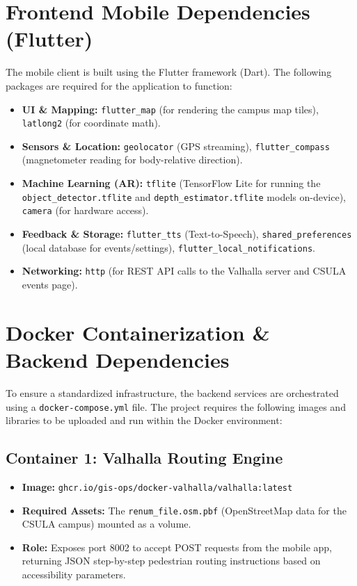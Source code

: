 \documentclass[12pt]{article}
\begin{document}
\section{Frontend Mobile Dependencies (Flutter)}
The mobile client is built using the Flutter framework (Dart). The following packages are required for the application to function:
\begin{itemize}[noitemsep]
    \item \textbf{UI \& Mapping:} \texttt{flutter\_map} (for rendering the campus map tiles), \texttt{latlong2} (for coordinate math).
    \item \textbf{Sensors \& Location:} \texttt{geolocator} (GPS streaming), \texttt{flutter\_compass} (magnetometer reading for body-relative direction).
    \item \textbf{Machine Learning (AR):} \texttt{tflite} (TensorFlow Lite for running the \texttt{object\_detector.tflite} and \texttt{depth\_estimator.tflite} models on-device), \texttt{camera} (for hardware access).
    \item \textbf{Feedback \& Storage:} \texttt{flutter\_tts} (Text-to-Speech), \texttt{shared\_preferences} (local database for events/settings), \texttt{flutter\_local\_notifications}.
    \item \textbf{Networking:} \texttt{http} (for REST API calls to the Valhalla server and CSULA events page).
\end{itemize}

\section{Docker Containerization \& Backend Dependencies}
To ensure a standardized infrastructure, the backend services are orchestrated using a \texttt{docker-compose.yml} file. The project requires the following images and libraries to be uploaded and run within the Docker environment:

\subsection{Container 1: Valhalla Routing Engine}
\begin{itemize}[noitemsep]
    \item \textbf{Image:} \texttt{ghcr.io/gis-ops/docker-valhalla/valhalla:latest}
    \item \textbf{Required Assets:} The \texttt{renum\_file.osm.pbf} (OpenStreetMap data for the CSULA campus) mounted as a volume.
    \item \textbf{Role:} Exposes port 8002 to accept POST requests from the mobile app, returning JSON step-by-step pedestrian routing instructions based on accessibility parameters.
\end{itemize}
\end{document}
